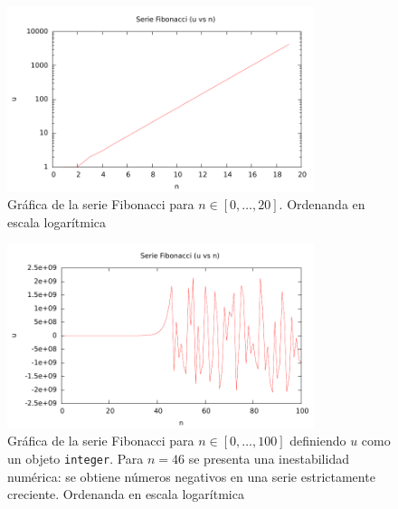 \begin{figure} [H]
\begin{center}
\includegraphics[width=0.8\textwidth]{./parte2/graficos/grafico_p2_1.pdf}
\caption{Gráfica de la serie Fibonacci para $n \in [0, \ldots , 20]$. Ordenanda en escala logarítmica} \label{fig_P1_2_1}
\end{center}
\end{figure}

\begin{figure} [H]
\begin{center}
\includegraphics[width=0.8\textwidth]{./parte2/graficos/grafico_p2_2.pdf}
\caption{Gráfica de la serie Fibonacci para $n \in [0, \ldots , 100]$ definiendo $u$ como un objeto \texttt{integer}. Para $n=46$ se presenta una inestabilidad numérica: se obtiene números negativos en una serie estrictamente creciente. Ordenanda en escala logarítmica} \label{fig_P1_2_2}
\end{center}
\end{figure}

